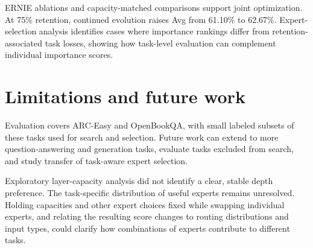 \documentclass{article}
\begin{document}
ERNIE ablations and capacity-matched comparisons support joint optimization. At 75\% retention, continued evolution raises Avg from 61.10\% to 62.67\%. Expert-selection analysis identifies cases where importance rankings differ from retention-associated task losses, showing how task-level evaluation can complement individual importance scores.

\section{Limitations and future work}
\label{sec:8}
Evaluation covers ARC-Easy and OpenBookQA, with small labeled subsets of these tasks used for search and selection. Future work can extend to more question-answering and generation tasks, evaluate tasks excluded from search, and study transfer of task-aware expert selection.

Exploratory layer-capacity analysis did not identify a clear, stable depth preference. The task-specific distribution of useful experts remains unresolved. Holding capacities and other expert choices fixed while swapping individual experts, and relating the resulting score changes to routing distributions and input types, could clarify how combinations of experts contribute to different tasks.
\end{document}
